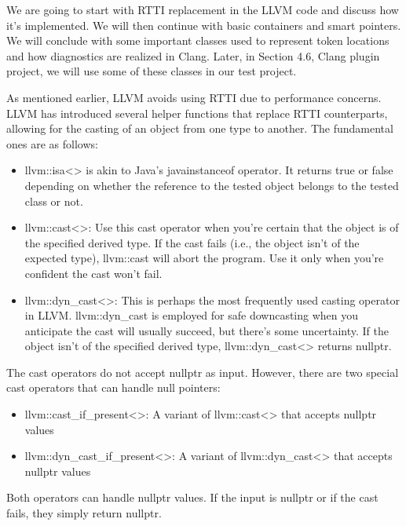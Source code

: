 We are going to start with RTTI replacement in the LLVM code and discuss how it’s implemented. We will then continue with basic containers and smart pointers. We will conclude with some important classes used to represent token locations and how diagnostics are realized in Clang. Later, in Section 4.6, Clang plugin project, we will use some of these classes in our test project.


As mentioned earlier, LLVM avoids using RTTI due to performance concerns. LLVM has introduced several helper functions that replace RTTI counterparts, allowing for the casting of an object from one type to another. The fundamental ones are as follows:

\begin{itemize}
\item
llvm::isa<> is akin to Java’s javainstanceof operator. It returns true or false depending on whether the reference to the tested object belongs to the tested class or not.

\item
llvm::cast<>: Use this cast operator when you’re certain that the object is of the specified derived type. If the cast fails (i.e., the object isn’t of the expected type), llvm::cast will abort the program. Use it only when you’re confident the cast won’t fail.

\item
llvm::dyn\_cast<>: This is perhaps the most frequently used casting operator in LLVM. llvm::dyn\_cast is employed for safe downcasting when you anticipate the cast will usually succeed, but there’s some uncertainty. If the object isn’t of the specified derived type, llvm::dyn\_cast<> returns nullptr.
\end{itemize}

The cast operators do not accept nullptr as input. However, there are two special cast operators that can handle null pointers:

\begin{itemize}
\item
llvm::cast\_if\_present<>: A variant of llvm::cast<> that accepts nullptr values

\item
llvm::dyn\_cast\_if\_present<>: A variant of llvm::dyn\_cast<> that accepts nullptr values
\end{itemize}

Both operators can handle nullptr values. If the input is nullptr or if the cast fails, they simply return nullptr.

